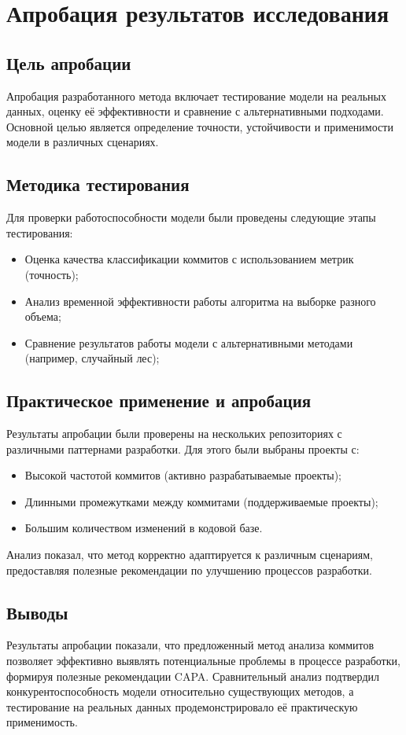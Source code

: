 \chapter{Апробация результатов исследования} \label{ch4}

\section{Цель апробации} \label{ch4:sec1}
Апробация разработанного метода включает тестирование модели на реальных данных, оценку её эффективности и сравнение с альтернативными подходами. Основной целью является определение точности, устойчивости и применимости модели в различных сценариях. 

\section{Методика тестирования} \label{ch4:sec2}
Для проверки работоспособности модели были проведены следующие этапы тестирования:
\begin{itemize}
	\item Оценка качества классификации коммитов с использованием метрик (точность);
	\item Анализ временной эффективности работы алгоритма на выборке разного объема;
	\item Сравнение результатов работы модели с альтернативными методами (например, случайный лес);
\end{itemize}


\section{Практическое применение и апробация} \label{ch4:sec3}
Результаты апробации были проверены на нескольких репозиториях с различными паттернами разработки. Для этого были выбраны проекты с:
\begin{itemize}
	\item Высокой частотой коммитов (активно разрабатываемые проекты);
	\item Длинными промежутками между коммитами (поддерживаемые проекты);
	\item Большим количеством изменений в кодовой базе.
\end{itemize}

Анализ показал, что метод корректно адаптируется к различным сценариям, предоставляя полезные рекомендации по улучшению процессов разработки.

\section{Выводы} \label{ch4:conclusion}
Результаты апробации показали, что предложенный метод анализа коммитов позволяет эффективно выявлять потенциальные проблемы в процессе разработки, формируя полезные рекомендации CAPA. Сравнительный анализ подтвердил конкурентоспособность модели относительно существующих методов, а тестирование на реальных данных продемонстрировало её практическую применимость.
